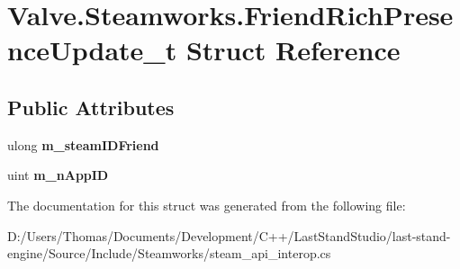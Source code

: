 \hypertarget{structValve_1_1Steamworks_1_1FriendRichPresenceUpdate__t}{}\section{Valve.\+Steamworks.\+Friend\+Rich\+Presence\+Update\+\_\+t Struct Reference}
\label{structValve_1_1Steamworks_1_1FriendRichPresenceUpdate__t}
\subsection*{Public Attributes}
\begin{DoxyCompactItemize}
\item 
\hypertarget{structValve_1_1Steamworks_1_1FriendRichPresenceUpdate__t_a35d6e387ca686d87728d3845a9e453d8}{}ulong {\bfseries m\+\_\+steam\+I\+D\+Friend}\label{structValve_1_1Steamworks_1_1FriendRichPresenceUpdate__t_a35d6e387ca686d87728d3845a9e453d8}

\item 
\hypertarget{structValve_1_1Steamworks_1_1FriendRichPresenceUpdate__t_a8e2effca513cfd66c5cf424d924c4dfd}{}uint {\bfseries m\+\_\+n\+App\+I\+D}\label{structValve_1_1Steamworks_1_1FriendRichPresenceUpdate__t_a8e2effca513cfd66c5cf424d924c4dfd}

\end{DoxyCompactItemize}


The documentation for this struct was generated from the following file\+:\begin{DoxyCompactItemize}
\item 
D\+:/\+Users/\+Thomas/\+Documents/\+Development/\+C++/\+Last\+Stand\+Studio/last-\/stand-\/engine/\+Source/\+Include/\+Steamworks/steam\+\_\+api\+\_\+interop.\+cs\end{DoxyCompactItemize}
